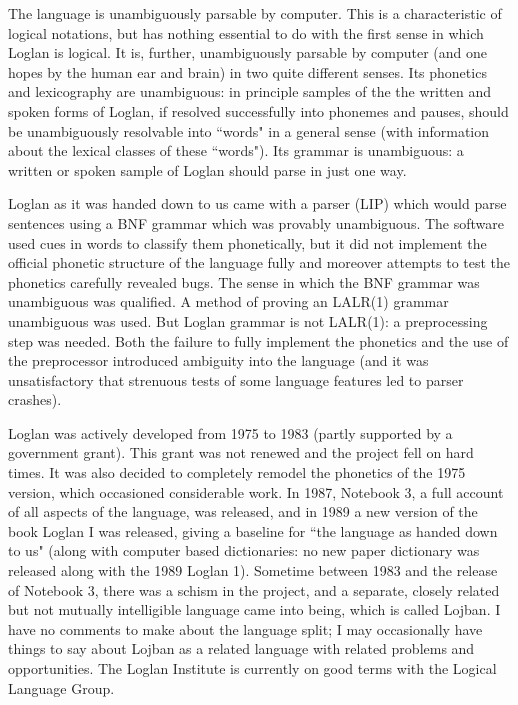 \documentclass[12pt]{article}
\begin{document}
The language is unambiguously parsable by computer.  This is a characteristic of logical notations, but has nothing essential to do with the first sense in which Loglan is logical.  It is, further, unambiguously parsable by computer (and one hopes by the human ear and brain) in two quite different senses.  Its phonetics and lexicography are unambiguous:  in principle samples of the the written and spoken forms of Loglan, if resolved successfully into phonemes and pauses,  should be unambiguously resolvable into ``words" in a general sense (with information about the lexical classes of these ``words").  Its grammar is unambiguous:  a written or spoken sample of Loglan should parse in just one way.

Loglan as it was handed down to us came with a parser (LIP) which would parse sentences using a BNF grammar which was provably unambiguous.  The software used cues in words to classify them phonetically, but it did not implement the official phonetic structure of the language fully and moreover attempts to test the phonetics carefully revealed bugs.  The sense in which the BNF grammar was unambiguous was qualified.  A method of proving an LALR(1) grammar unambiguous was used.
But Loglan grammar is not LALR(1):  a preprocessing step was needed.  Both the failure to fully implement the phonetics and the use of the preprocessor introduced ambiguity into the language (and it was unsatisfactory that strenuous tests of some language features led to parser crashes).

Loglan was actively developed from 1975 to 1983 (partly supported by a government grant).  This grant was not renewed and the project fell on hard times.  It was also decided to completely remodel the phonetics of the 1975 version, which occasioned considerable work.   In 1987, Notebook 3, a full account of all aspects of the language, was released, and in 1989 a new version of the book Loglan I was released, giving a baseline for ``the language as handed down to us" (along with computer based dictionaries:  no new paper dictionary was released along with the 1989 Loglan 1).  Sometime between 1983 and the release of Notebook 3, there was a schism in the project, and a separate, closely related but not mutually intelligible language came into being, which is called Lojban.  I have no comments to make about the language split;  I may occasionally have things to say about Lojban as a related language with related problems and opportunities.  The Loglan Institute is currently on good terms with the Logical Language Group.
\end{document}
